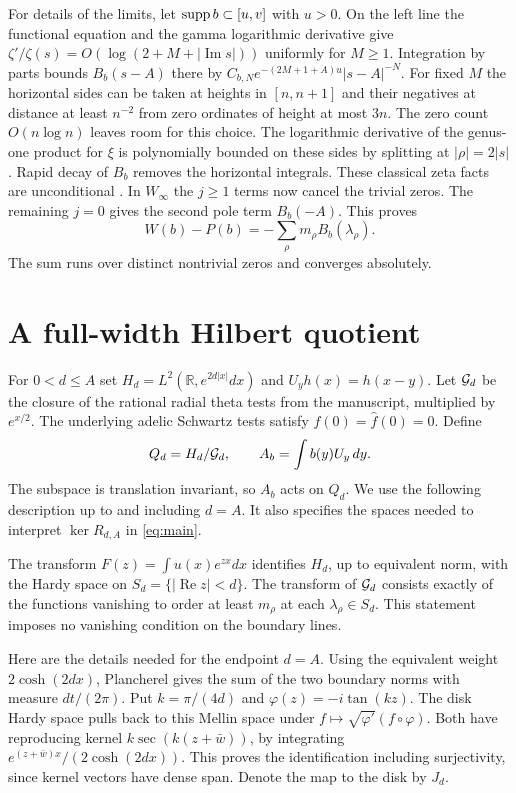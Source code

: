 \documentclass[11pt,letterpaper]{article}
\newcommand{\R}{\mathbb R}\newcommand{\Q}{\mathbb Q}\newcommand{\C}{\mathbb C}
\newcommand{\re}{\operatorname{Re}}\newcommand{\im}{\operatorname{Im}}
\newcommand{\dd}{\,d}\newcommand{\id}{\mathrm{Id}}
\newcommand{\step}[1]{\par\smallskip{\color{ink}\bfseries #1}\enspace}
\newcommand{\partpage}[2]{\clearpage\section{#1}\label{#2}}
\begin{document}
For details of the limits, let \(\operatorname{supp} b\subset[u,v]\) with \(u>0\). On the left line the functional equation and the gamma logarithmic derivative give \(\zeta'/\zeta(s)=O(\log(2+M+|\im s|))\) uniformly for \(M\ge1\). Integration by parts bounds \(B_b(s-A)\) there by \(C_{b,N} e^{-(2M+1+A)u}|s-A|^{-N}\). For fixed \(M\) the horizontal sides can be taken at heights in \([n,n+1]\) and their negatives at distance at least \(n^{-2}\) from zero ordinates of height at most \(3n\). The zero count \(O(n\log n)\) leaves room for this choice. The logarithmic derivative of the genus-one product for \(\xi\) is polynomially bounded on these sides by splitting at \(|\rho|=2|s|\). Rapid decay of \(B_b\) removes the horizontal integrals. These classical zeta facts are unconditional \cite{bombieri}. In \(W_\infty\) the \(j\ge1\) terms now cancel the trivial zeros. The remaining \(j=0\) gives the second pole term \(B_b(-A)\). This proves
\begin{equation}
            W(b)-P(b)=-\sum_\rho m_\rho B_b(\lambda_\rho).
            \label{eq:full}
\end{equation}
The sum runs over distinct nontrivial zeros and converges absolutely.

\partpage{A full-width Hilbert quotient}{sec:space}
For \(0<d\le A\) set \(H_d=L^2(\R,e^{2d|x|}dx)\) and \(U_yh(x)=h(x-y)\). Let \(\mathcal G_d\) be the closure of the rational radial theta tests from the manuscript, multiplied by \(e^{x/2}\). The underlying adelic Schwartz tests satisfy \(f(0)=\widehat f(0)=0\). Define
\[
 Q_d=H_d/\G_d,\qquad A_b=\int b(y)U_y\dd y .
\]
The subspace is translation invariant, so \(A_b\) acts on \(Q_d\). We use the following description up to and including \(d=A\). It also specifies the spaces needed to interpret \(\ker R_{d,A}\) in \eqref{eq:main}.

\step{Theta closure in Mellin coordinates.}
The transform \(F(z)=\int u(x)e^{zx}dx\) identifies \(H_d\), up to equivalent norm, with the Hardy space on \(S_d=\{|\re z|<d\}\). The transform of \(\mathcal G_d\) consists exactly of the functions vanishing to order at least \(m_\rho\) at each \(\lambda_\rho\in S_d\). This statement imposes no vanishing condition on the boundary lines.

Here are the details needed for the endpoint \(d=A\). Using the equivalent weight \(2\cosh(2dx)\), Plancherel gives the sum of the two boundary norms with measure \(dt/(2\pi)\). Put \(k=\pi/(4d)\) and \(\varphi(z)=-i\tan(kz)\). The disk Hardy space pulls back to this Mellin space under \(f\mapsto\sqrt{\varphi'}(f\circ\varphi)\). Both have reproducing kernel \(k\sec(k(z+\bar w))\), by integrating \(e^{(z+\bar w)x}/(2\cosh(2dx))\). This proves the identification including surjectivity, since kernel vectors have dense span. Denote the map to the disk by \(J_d\).
\end{document}
